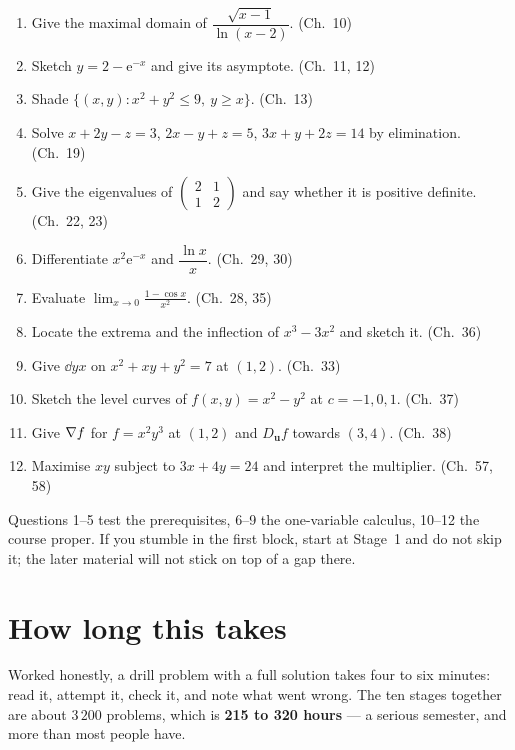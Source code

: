\begin{enumerate}[leftmargin=2.0em,itemsep=0.35ex]
  \item Give the maximal domain of $\dfrac{\sqrt{x-1}}{\ln(x-2)}$.
        \hfill (Ch.~10)
  \item Sketch $y=2-\mathrm{e}^{-x}$ and give its asymptote.
        \hfill (Ch.~11, 12)
  \item Shade $\{(x,y): x^{2}+y^{2}\le 9,\ y\ge x\}$.
        \hfill (Ch.~13)
  \item Solve $x+2y-z=3$, $2x-y+z=5$, $3x+y+2z=14$ by elimination.
        \hfill (Ch.~19)
  \item Give the eigenvalues of
        $\left(\begin{smallmatrix}2&1\\1&2\end{smallmatrix}\right)$ and say
        whether it is positive definite. \hfill (Ch.~22, 23)
  \item Differentiate $x^{2}\mathrm{e}^{-x}$ and $\dfrac{\ln x}{x}$.
        \hfill (Ch.~29, 30)
  \item Evaluate $\displaystyle\lim_{x\to0}\frac{1-\cos x}{x^{2}}$.
        \hfill (Ch.~28, 35)
  \item Locate the extrema and the inflection of $x^{3}-3x^{2}$ and sketch
        it. \hfill (Ch.~36)
  \item Give $\dd{y}{x}$ on $x^{2}+xy+y^{2}=7$ at $(1,2)$.
        \hfill (Ch.~33)
  \item Sketch the level curves of $f(x,y)=x^{2}-y^{2}$ at
        $c=-1,0,1$. \hfill (Ch.~37)
  \item Give $\nabla f$ for $f=x^{2}y^{3}$ at $(1,2)$ and
        $D_{\mathbf{u}}f$ towards $(3,4)$. \hfill (Ch.~38)
  \item Maximise $xy$ subject to $3x+4y=24$ and interpret the multiplier.
        \hfill (Ch.~57, 58)
\end{enumerate}

Questions 1--5 test the prerequisites, 6--9 the one-variable calculus,
10--12 the course proper. If you stumble in the first block, start at
Stage~1 and do not skip it; the later material will not stick on top of a
gap there.

\section*{How long this takes}

Worked honestly, a drill problem with a full solution takes four to six
minutes: read it, attempt it, check it, and note what went wrong. The ten
stages together are about $3\,200$ problems, which is \textbf{215 to 320
hours} --- a serious semester, and more than most people have.

